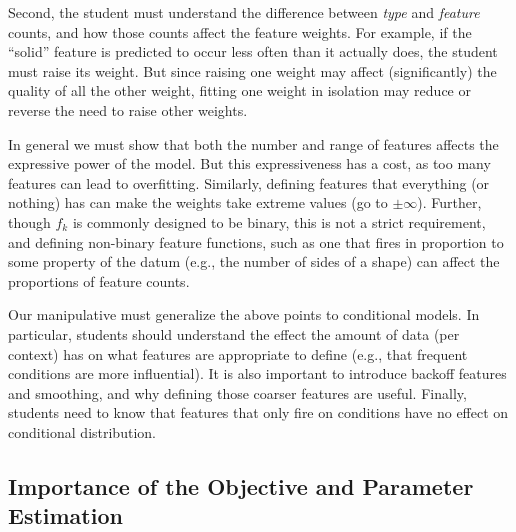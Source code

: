 \documentclass[11pt,letterpaper]{article}
\newcommand{\Data}[0]{\ensuremath{\mathcal{D}}}
\begin{document}
Second, the student must understand the difference between \textit{type} and 
\textit{feature} counts, and how those counts affect the feature weights. 
For example, if the “solid” feature is predicted to occur less often 
than it actually does, the student must raise its weight. But since raising one weight 
may affect (significantly) the quality of all the other weight, fitting one weight in
isolation may reduce or reverse the need to raise other weights. 

In general we must show that both the number and range of features affects the expressive 
power of the model. But this expressiveness has a cost, as too many features can lead to overfitting. 
Similarly, defining features that everything (or nothing) has can make the weights 
take extreme values (go to $\pm \infty$). Further, though $f_k$ is commonly designed to be binary, 
this is not a strict requirement, and defining non-binary feature functions, such as one that fires in 
proportion to some property of the datum (e.g., the number of sides of a shape) can affect the
proportions of feature counts.

Our manipulative must generalize the above points to conditional models. In particular, students should 
understand the effect the amount of data (per context) has on what features are appropriate to define 
(e.g., that frequent conditions are more influential). It is also important to introduce backoff features 
and smoothing, and why defining those coarser features are useful. Finally, students need to know that 
features that only fire on conditions have no effect on conditional distribution.



\subsection{Importance of the Objective and Parameter Estimation} %
\end{document}

